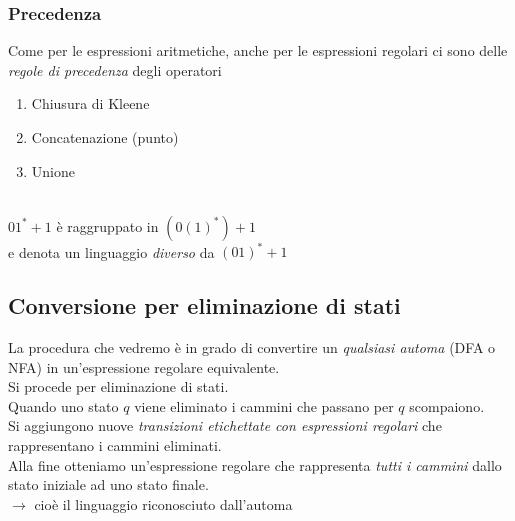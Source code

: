 \subsubsection{Precedenza}
Come per le espressioni aritmetiche, anche per le espressioni regolari ci sono delle \textit{regole di precedenza} degli operatori
\begin{enumerate}
	\item Chiusura di Kleene
	\item Concatenazione (punto)
	\item Unione
\end{enumerate}
\\
$01^*+1$ è raggruppato in $(0(1)^*)+1$\\
e denota un linguaggio \textit{diverso} da $(01)^*+1$
\subsection{Conversione per eliminazione di stati}
La procedura che vedremo è in grado di convertire un \textit{qualsiasi automa} (DFA o NFA) in un'{espressione regolare} equivalente.\\
Si procede per {eliminazione di stati}.\\
Quando uno stato $q$ viene eliminato i cammini che passano per $q$ scompaiono.\\
Si aggiungono nuove \textit{transizioni etichettate con espressioni regolari} che rappresentano i cammini eliminati.\\
Alla fine otteniamo un'espressione regolare che rappresenta \textit{tutti i cammini} dallo stato iniziale ad uno stato finale.\\
	$\rightarrow$ cioè il {linguaggio riconosciuto dall'automa}

